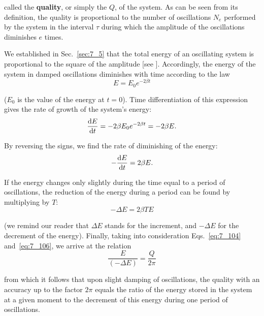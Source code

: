 \noindent
called the \textbf{quality}, or simply the $Q$, of the system. As can be seen from its definition, the quality is proportional to the number of oscillations $N_e$ performed by the system in the interval $\tau$ during which the amplitude of the oscillations diminishes $e$ times.

We established in Sec.~\ref{sec:7_5} that the total energy of an oscillating system is proportional to the square of the amplitude [see ]. Accordingly, the energy of the system in damped oscillations diminishes with time according to the law
\begin{equation}\label{eq:7_107}
	E = E_0 e^{-2\beta t}
\end{equation}

\noindent
($E_0$ is the value of the energy at $t=0$). Time differentiation of this expression gives the rate of growth of the system's energy:
\begin{equation*}
	\frac{\mathrm{d} E}{\mathrm{d} t} = -2\beta E_0 e^{-2\beta t} = -2\beta E.
\end{equation*}

\noindent
By reversing the signs, we find the rate of diminishing of the energy:
\begin{equation}\label{eq:7_108}
	-\frac{\mathrm{d} E}{\mathrm{d} t} = 2\beta E.
\end{equation}

\noindent
If the energy changes only slightly during the time equal to a period of oscillations, the reduction of the energy during a period can be found by multiplying  by $T$:
\begin{equation*}
	-\Delta E = 2\beta T E
\end{equation*}

\noindent
(we remind our reader that $\Delta E$ stands for the increment, and $-\Delta E$ for the decrement of the energy). Finally, taking into consideration Eqs.~\eqref{eq:7_104} and~\eqref{eq:7_106}, we arrive at the relation
\begin{equation}\label{eq:7_109}
	\frac{E}{(-\Delta E)} = \frac{Q}{2\pi}
\end{equation}

\noindent
from which it follows that upon slight damping of oscillations, the quality with an accuracy up to the factor $2\pi$ equals the ratio of the energy stored in the system at a given moment to the decrement of this energy during one period of oscillations.

